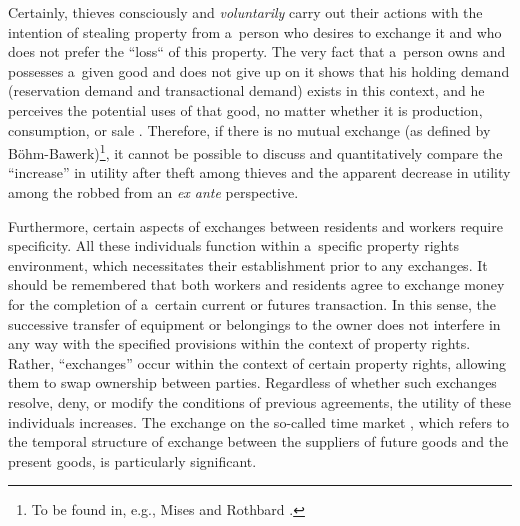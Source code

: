 Certainly, thieves consciously and \textit{voluntarily} carry out their actions with the intention of stealing property from a~person who desires to exchange it and who does not prefer the ``loss`` of this property. The very fact that a~person owns and possesses a~given good and does not give up on it shows that his holding demand (reservation demand and transactional demand) exists in this context, and he perceives the potential uses of that good, no matter whether it is production, consumption, or sale 
\parencite[][pp.137–142]{rothbard_man_2009}. %
 Therefore, if there is no mutual exchange (as defined by Böhm-Bawerk)\footnote{To be found in, e.g., Mises 
\parencite[pp.213–232,][]{} %
 and Rothbard 
\parencite[pp.95–169,][]{}. %
 }, it cannot be possible to discuss and quantitatively compare the ``increase'' in utility after theft among thieves and the apparent decrease in utility among the robbed from an \textit{ex ante} perspective.



Furthermore, certain aspects of exchanges between residents and workers require specificity. All these individuals function within a~specific property rights environment, which necessitates their establishment prior to any exchanges. It should be remembered that both workers and residents agree to exchange money for the completion of a~certain current or futures transaction. In this sense, the successive transfer of equipment or belongings to the owner does not interfere in any way with the specified provisions within the context of property rights. Rather, ``exchanges'' occur within the context of certain property rights, allowing them to swap ownership between parties. Regardless of whether such exchanges resolve, deny, or modify the conditions of previous agreements, the utility of these individuals increases. The exchange on the so-called time market 
\parencite[][pp.390–410]{rothbard_man_2009}, %
 which refers to the temporal structure of exchange between the suppliers of future goods and the present goods, is particularly significant.



